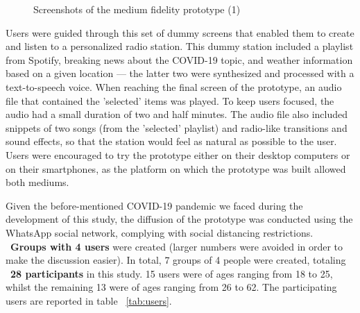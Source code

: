 {{\begin{figure}[htbp]
		 \qquad
	\caption{Screenshots of the medium fidelity prototype (1)}
	\label{fig:mfp1}
\end{figure}

Users were guided through this set of dummy screens that enabled them to create and listen to a personalized radio station. This dummy station included a playlist from Spotify, breaking news about the COVID-19 topic, and weather information based on a given location — the latter two were synthesized and processed with a text-to-speech voice. When reaching the final screen of the prototype, an audio file that contained the 'selected' items was played. To keep users focused, the audio had a small duration of two and half minutes. The audio file also included snippets of two songs (from the 'selected' playlist) and radio-like transitions and sound effects, so that the station would feel as natural as possible to the user. Users were encouraged to try the prototype either on their desktop computers or on their smartphones, as the platform on which the prototype was built allowed both mediums.

Given the before-mentioned COVID-19 pandemic we faced during the development of this study, the diffusion of the prototype was conducted using the WhatsApp social network, complying with social distancing restrictions.  ~\textbf{Groups with 4 users} were created (larger numbers were avoided in order to make the discussion easier). In total, 7 groups of 4 people were created, totaling ~\textbf{28 participants} in this study. 15 users were of ages ranging from 18 to 25, whilst the remaining 13 were of ages ranging from 26 to 62. The participating users are reported in table ~\ref{tab:users}.

}}
